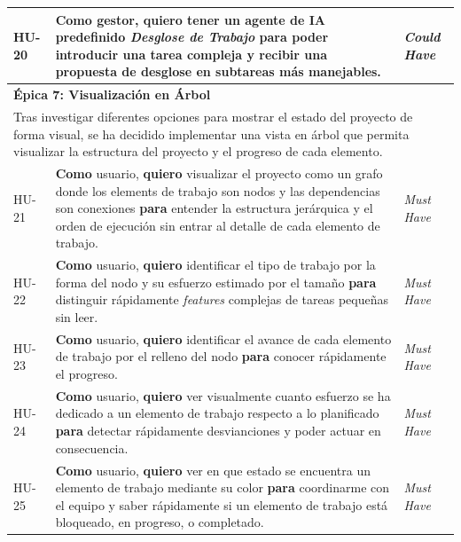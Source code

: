 \begin{longtable}{|p{1.5cm}|p{9cm}|p{3cm}|}
HU-20 &
\textbf{Como} gestor, \textbf{quiero} tener un agente de \ac{IA} predefinido \emph{Desglose de Trabajo} \textbf{para} poder introducir una tarea compleja y recibir una propuesta de desglose en subtareas más manejables.
& \emph{Could Have} \\
\hline

\multicolumn{3}{|l|}{\cellcolor{gray!15}\textbf{Épica 7: Visualización en Árbol}} \\
\hline

\multicolumn{3}{|p{\dimexpr\linewidth-2\tabcolsep-2\arrayrulewidth\relax}|}{
Tras investigar diferentes opciones para mostrar el estado del proyecto de forma visual, se ha decidido implementar una vista en árbol que permita visualizar la estructura del proyecto y el progreso de cada elemento.
} \\
\hline

HU-21 &
\textbf{Como} usuario, \textbf{quiero} visualizar el proyecto como un grafo donde los elements de trabajo son nodos y las dependencias son conexiones \textbf{para} entender la estructura jerárquica y el orden de ejecución sin entrar al detalle de cada elemento de trabajo.
& \emph{Must Have} \\
\hline

HU-22 &
\textbf{Como} usuario, \textbf{quiero} identificar el tipo de trabajo por la forma del nodo y su esfuerzo estimado por el tamaño \textbf{para} distinguir rápidamente \emph{features} complejas de tareas pequeñas sin leer.
& \emph{Must Have} \\
\hline

HU-23 &
\textbf{Como} usuario, \textbf{quiero} identificar el avance de cada elemento de trabajo por el relleno del nodo \textbf{para} conocer rápidamente el progreso.
& \emph{Must Have} \\
\hline

HU-24 &
\textbf{Como} usuario, \textbf{quiero} ver visualmente cuanto esfuerzo se ha dedicado a un elemento de trabajo respecto a lo planificado \textbf{para} detectar rápidamente desvianciones y poder actuar en consecuencia.
& \emph{Must Have} \\
\hline

HU-25 &
\textbf{Como} usuario, \textbf{quiero} ver en que estado se encuentra un elemento de trabajo mediante su color \textbf{para} coordinarme con el equipo y saber rápidamente si un elemento de trabajo está bloqueado, en progreso, o completado.
& \emph{Must Have} \\
\hline


\end{longtable}
